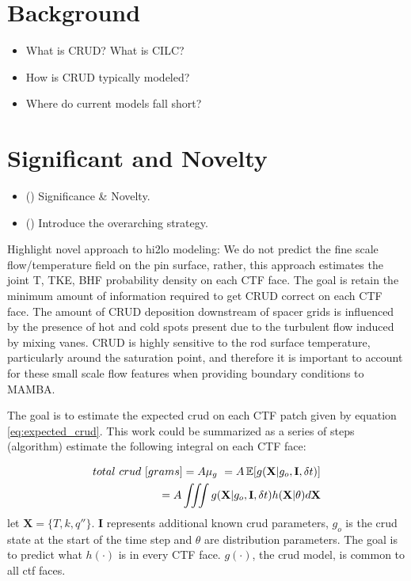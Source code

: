 \section{Background}

\begin{itemize}
	\item What is CRUD?  What is CILC?
	\item How is CRUD typically modeled?
	\item Where do current models fall short?
\end{itemize}

\section{Significant and Novelty}

\begin{itemize}
    \item (\checkmark) Significance \& Novelty.
    \item (\checkmark) Introduce the overarching strategy.
\end{itemize}

Highlight novel approach to hi2lo modeling:  We do not predict the fine scale flow/temperature field on the pin surface, rather, this approach estimates the joint T, TKE, BHF probability density on each CTF face.  The goal is retain the minimum amount of information required to get CRUD correct on each CTF face.  The amount of CRUD deposition downstream of spacer grids is influenced by the presence of hot and cold spots present due to the turbulent flow induced by mixing vanes.  CRUD is highly sensitive to the rod surface temperature, particularly around the saturation point, and therefore it is important to account for these small scale flow features when providing boundary conditions to MAMBA.

The goal is to estimate the expected crud on each CTF patch given by equation \ref{eq:expected_crud}.
This work could be summarized as a series of steps (algorithm) estimate the following integral on each CTF face:

\begin{eqnarray}
        total\ crud\ [grams] = A \mu_g\ = A \operatorname*{\mathbb{E}}[g(\mathbf X|g_o, \mathbf I, \delta t)] \nonumber \\
	= A \iiint g(\mathbf X|g_o, \mathbf I, \delta t) h(\mathbf X|\theta) d \mathbf X
	\label{eq:expected_crud}
\end{eqnarray}
let $\mathbf X= \{T, k, q''\}$. $\mathbf I$ represents additional known crud parameters, $g_o$ is the crud state at the start of the time step and $\theta$ are distribution parameters.  The goal is to predict what $h(\cdot)$ is in every CTF face.  $g(\cdot)$, the crud model, is common to all ctf faces.

